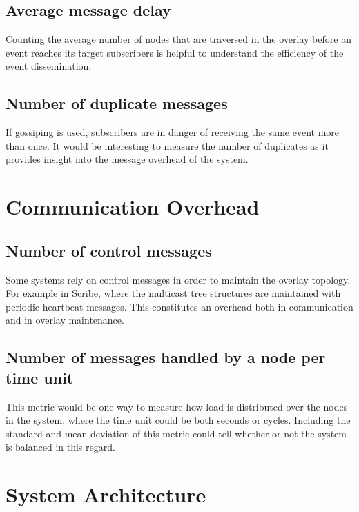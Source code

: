 \subsection{Average message delay}

Counting the average number of nodes that are traversed in the
overlay before an event reaches its target subscribers is
helpful to understand the efficiency of the event dissemination.

\subsection{Number of duplicate messages}

If gossiping is used, subscribers are in danger of receiving the
same event more than once. It would be interesting to measure
the number of duplicates as it provides insight into the message overhead of the
system.


\section{Communication Overhead}

\subsection{Number of control messages}

Some systems rely on control messages in order to maintain the overlay
topology. For example in Scribe, where the multicast tree structures are
maintained with periodic heartbeat messages. This constitutes an
overhead both in communication and in overlay maintenance.

\subsection{Number of messages handled by a node per time unit}

This metric would be one way to measure how load is distributed
over the nodes in the system, where the time unit could be both
seconds or cycles. Including the standard and mean deviation of
this metric could tell whether or not the system is balanced in
this regard.

\section{System Architecture}




